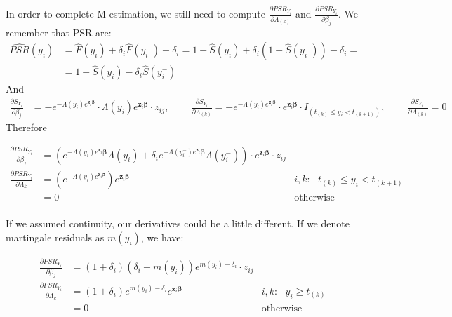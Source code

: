 \documentclass[]{article}
\begin{document}
In order to complete M-estimation, we still need to compute $\frac{\partial PSR_{Y_i}}{ \partial \Lambda_{(k)}}$ and $\frac{\partial PSR_{Y_i}}{ \partial \beta_j}$. We remember that PSR are: 
  $$
  \begin{aligned}
    \widehat{PSR}(y_i) &= \hat{F}(y_i) + \delta_i \hat{F}(y_i^-) - \delta_i  = 1-\hat{S}(y_i) + \delta_i (1 - \hat{S}(y_i^-)) - \delta_i = \\
    & = 1-\hat{S}(y_i) - \delta_i \hat{S}(y_i^-)
  \end{aligned}
  $$
And
  $$
  \begin{aligned}
    \frac{\partial S_{Y_i}}{\partial \beta_j} & = -e^{-\Lambda(y_i)e^{\pmb{z}_i\pmb{\beta}}}\cdot \Lambda(y_i)e^{\pmb{z}_i\pmb{\beta}}  \cdot z_{ij} 
    ,~~~~~~~~~~ \frac{\partial S_{Y_i}}{\partial \Lambda_{(k)}} =   -e^{-\Lambda(y_i)e^{\pmb{z}_i\pmb{\beta}}}\cdot e^{\pmb{z}_i\pmb{\beta}}  \cdot I_{(t_{(k)} \leq y_i <  t_{(k+1)})},~~~~~~~~~~ \frac{\partial S_{Y_i^-}}{\partial \Lambda_{(k)}} = 0
  \end{aligned}
  $$
Therefore

  $$
  \begin{aligned}
    \frac{\partial PSR_{Y_i}}{\partial \beta_j} & =   \left( e^{-\Lambda(y_i)e^{\pmb{z}_i}\pmb{\beta}}  \Lambda(y_i) + \delta_i e^{-\Lambda(y_i^-)e^{\pmb{z}_i}\pmb{\beta}}  \Lambda(y_i^-) \right) \cdot e^{\pmb{z}_i\pmb{\beta}}  \cdot z_{ij} \\
    \frac{\partial PSR_{Y_i}}{\partial \Lambda_k} & = \left( e^{-\Lambda(y_i)e^{\pmb{z}_i\pmb{\beta}}}  \right) e^{\pmb{z}_i\pmb{\beta}}  ~~~~  &i,k:~~~t_{(k)} \leq y_i < t_{(k+1)} \\
      &= 0 ~~~~  &\text{otherwise} \\
  \end{aligned}
  $$
  
If we assumed continuity, our derivatives could be a little different. If we denote martingale residuals as $m(y_i)$, we have:

  $$
  \begin{aligned}
    \frac{\partial PSR_{Y_i}}{\partial \beta_j} & =  (1+\delta_i)  \left( \delta_i   -  m(y_i)  \right) e^{m(y_i) - \delta_i}   \cdot z_{ij} \\
    \frac{\partial PSR_{Y_i}}{\partial \Lambda_k} & = (1+\delta_i)   e^{m(y_i) - \delta_i} e^{\pmb{z}_i\pmb{\beta}}   ~~~~  &i,k:~~~y_i \geq t_{(k)}\\
      &= 0 ~~~~  &\text{otherwise} \\
  \end{aligned}
  $$
\end{document}
